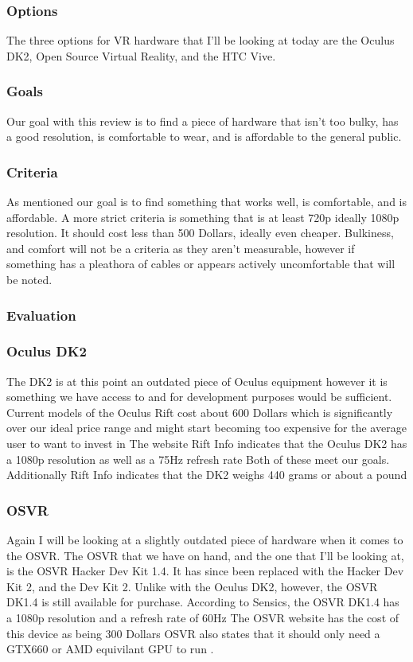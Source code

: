 \subsubsection{Options}
The three options for VR hardware that I'll be looking at today are the Oculus DK2, Open Source Virtual Reality, and the HTC Vive. 

\subsubsection{Goals}
Our goal with this review is to find a piece of hardware that isn't too bulky, has a good resolution, is comfortable to wear, and is affordable to the general public.

\subsubsection{Criteria}
As mentioned our goal is to find something that works well, is comfortable, and is affordable. 
A more strict criteria is something that is at least 720p ideally 1080p resolution.
It should cost less than 500 Dollars, ideally even cheaper.
Bulkiness, and comfort will not be a criteria as they aren't measurable, however if something has a pleathora of cables or appears actively uncomfortable that will be noted.

\subsubsection{Evaluation}
\subsubsection{Oculus DK2}
The DK2 is at this point an outdated piece of Oculus equipment however it is something we have access to and for development purposes would be sufficient. 
Current models of the Oculus Rift cost about 600 Dollars which is significantly over our ideal price range and might start becoming too expensive for the average user to want to invest in 
The website Rift Info indicates that the Oculus DK2 has a 1080p resolution as well as a 75Hz refresh rate
Both of these meet our goals.
Additionally Rift Info indicates that the DK2 weighs 440 grams or about a pound

\subsubsection{OSVR}
Again I will be looking at a slightly outdated piece of hardware when it comes to the OSVR. 
The OSVR that we have on hand, and the one that I'll be looking at, is the OSVR Hacker Dev Kit 1.4. 
It has since been replaced with the Hacker Dev Kit 2, and the Dev Kit 2.
Unlike with the Oculus DK2, however, the OSVR DK1.4 is still available for purchase.
According to Sensics, the OSVR DK1.4 has a 1080p resolution and a refresh rate of 60Hz
The OSVR website has the cost of this device as being 300 Dollars 
OSVR also states that it should only need a GTX660 or AMD equivilant GPU to run .

